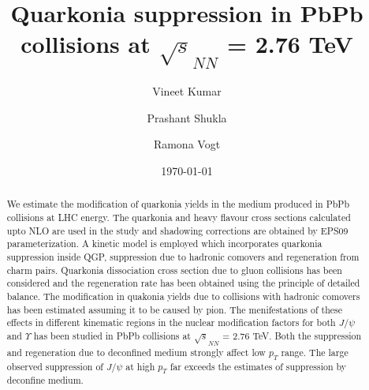 \documentclass[aps,prc,preprint,superscriptaddress,showpacs,showkeys]{revtex4-1}
\begin{document}
\newcommand{\Jpsi}{J/\psi}
\newcommand{\pT}{p_{T}}

\title{{\Large Quarkonia suppression in PbPb collisions at $\sqrt s_{NN}$ =  2.76 TeV }}
\author{\large Vineet Kumar}
\author{\large Prashant Shukla}
\author{\large Ramona Vogt}
\date{\today}

\begin{abstract}
  We estimate the modification of quarkonia yields in the medium produced in PbPb
collisions at LHC energy. The quarkonia and heavy flavour cross sections calculated 
upto NLO are used in the study and shadowing corrections are obtained by EPS09 parameterization.
 A kinetic model is employed which incorporates quarkonia  
suppression inside QGP, suppression due to hadronic comovers and 
regeneration from charm pairs.
 Quarkonia dissociation cross section due to gluon collisions has been considered and
the regeneration rate has been obtained using the principle of detailed balance.
The modification in quakonia yields due to collisions with hadronic comovers has been estimated 
assuming it to be caused by pion.  
  The menifestations of these effects in different kinematic regions in
the nuclear modification factors for both $\Jpsi$ and $\Upsilon$ has been studied
in PbPb collisions at $\sqrt s_{NN}$ =  2.76 TeV. 
  Both the suppression and regeneration due to deconfined medium strongly affect 
low $\pT$ range. The large observed suppression of $\Jpsi$ at high $p_T$ far exceeds
the estimates of suppression by deconfine medium.
\end{abstract}

\maketitle
\end{document}
